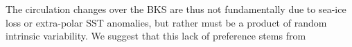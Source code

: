 \documentclass[grl]{AGUTeX}  %
\begin{document}
\begin{article}
The circulation changes over the BKS are thus not fundamentally due to sea-ice loss or extra-polar SST anomalies, but rather must be a product of random intrinsic variability. 
We suggest that this lack of preference stems from 









\end{article}
\end{document}
